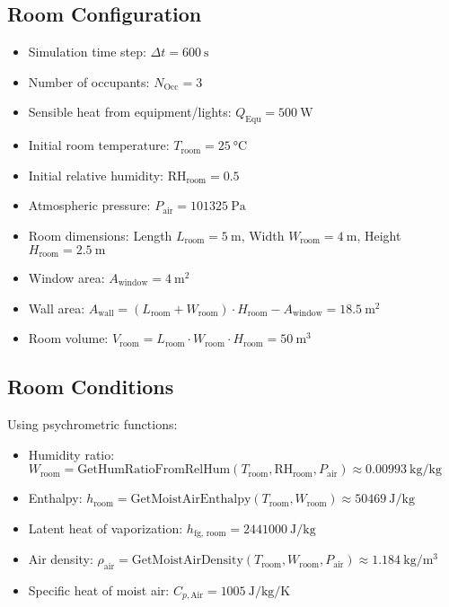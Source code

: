 \documentclass[12pt]{article}
\begin{document}
\subsection{Room Configuration}
\begin{itemize}
    \item Simulation time step: \( \Delta t = \SI{600}{\second} \)
    \item Number of occupants: \( N_{\text{Occ}} = 3 \)
    \item Sensible heat from equipment/lights: \( Q_{\text{Equ}} = \SI{500}{\watt} \)
    \item Initial room temperature: \( T_{\text{room}} = \SI{25}{\celsius} \)
    \item Initial relative humidity: \( \text{RH}_{\text{room}} = 0.5 \)
    \item Atmospheric pressure: \( P_{\text{air}} = \SI{101325}{\pascal} \)
    \item Room dimensions: Length \( L_{\text{room}} = \SI{5}{\meter} \), Width \( W_{\text{room}} = \SI{4}{\meter} \), Height \( H_{\text{room}} = \SI{2.5}{\meter} \)
    \item Window area: \( A_{\text{window}} = \SI{4}{\meter\squared} \)
    \item Wall area: \( A_{\text{wall}} = (L_{\text{room}} + W_{\text{room}}) \cdot H_{\text{room}} - A_{\text{window}} = \SI{18.5}{\meter\squared} \)
    \item Room volume: \( V_{\text{room}} = L_{\text{room}} \cdot W_{\text{room}} \cdot H_{\text{room}} = \SI{50}{\meter\cubed} \)
\end{itemize}

\subsection{Room Conditions}
Using psychrometric functions:
\begin{itemize}
    \item Humidity ratio: \( W_{\text{room}} = \text{GetHumRatioFromRelHum}(T_{\text{room}}, \text{RH}_{\text{room}}, P_{\text{air}}) \approx \SI{0.00993}{\kilo\gram\per\kilo\gram} \)
    \item Enthalpy: \( h_{\text{room}} = \text{GetMoistAirEnthalpy}(T_{\text{room}}, W_{\text{room}}) \approx \SI{50469}{\joule\per\kilo\gram} \)
    \item Latent heat of vaporization: \( h_{\text{fg, room}} = \SI{2441000}{\joule\per\kilo\gram} \)
    \item Air density: \( \rho_{\text{air}} = \text{GetMoistAirDensity}(T_{\text{room}}, W_{\text{room}}, P_{\text{air}}) \approx \SI{1.184}{\kilo\gram\per\meter\cubed} \)
    \item Specific heat of moist air: \( C_{p,\text{Air}} = \SI{1005}{\joule\per\kilo\gram\per\kelvin} \)
\end{itemize}
\end{document}
